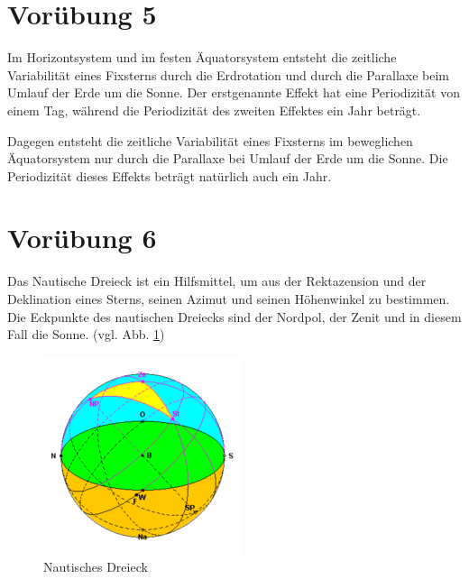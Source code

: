 \documentclass[titlepage]{scrartcl}
\begin{document}
\newpage

\section{Vorübung 5}

Im Horizontsystem und im festen Äquatorsystem entsteht die zeitliche Variabilität eines Fixsterns durch die Erdrotation und durch die Parallaxe beim Umlauf der Erde um die Sonne. Der erstgenannte Effekt hat eine Periodizität von einem Tag, während die Periodizität des zweiten Effektes ein Jahr beträgt.

Dagegen entsteht die zeitliche Variabilität eines Fixsterns im beweglichen Äquatorsystem nur durch die Parallaxe bei Umlauf der Erde um die Sonne. Die Periodizität dieses Effekts beträgt natürlich auch ein Jahr.

\section{Vorübung 6}

Das Nautische Dreieck ist ein Hilfsmittel, um aus der Rektazension und der Deklination eines Sterns, seinen Azimut und seinen Höhenwinkel zu bestimmen. Die Eckpunkte des nautischen Dreiecks sind der Nordpol, der Zenit und in diesem Fall die Sonne. (vgl. Abb. \ref{fig:Nautisches Dreieck})

\begin{figure}
        \includegraphics[width=.9\textwidth]{images/NautischesDreieck}
\caption{ Nautisches Dreieck }
\label{fig:Nautisches Dreieck}
\end{figure}
\end{document}

